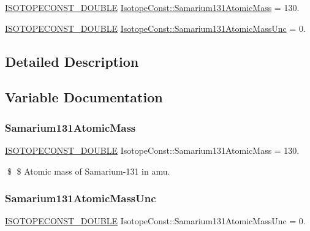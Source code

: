 \begin{DoxyCompactItemize}
\item 
\mbox{\hyperlink{group___isotope_const-_macros_ga8f45a7272ce02c0b4c65c44636ed719a}{I\+S\+O\+T\+O\+P\+E\+C\+O\+N\+S\+T\+\_\+\+D\+O\+U\+B\+LE}} \mbox{\hyperlink{group___isotope_const-_samarium-_sm131_ga10754d8bca74081ab3d7996f9eeef362}{Isotope\+Const\+::\+Samarium131\+Atomic\+Mass}} = 130.
\item 
\mbox{\hyperlink{group___isotope_const-_macros_ga8f45a7272ce02c0b4c65c44636ed719a}{I\+S\+O\+T\+O\+P\+E\+C\+O\+N\+S\+T\+\_\+\+D\+O\+U\+B\+LE}} \mbox{\hyperlink{group___isotope_const-_samarium-_sm131_ga5ceb183f8eaa890ce500002c03e512ac}{Isotope\+Const\+::\+Samarium131\+Atomic\+Mass\+Unc}} = 0.
\end{DoxyCompactItemize}


\subsection{Detailed Description}


\subsection{Variable Documentation}
\mbox{\label{group___isotope_const-_samarium-_sm131_ga10754d8bca74081ab3d7996f9eeef362}} 
\subsubsection{\texorpdfstring{Samarium131\+Atomic\+Mass}{Samarium131AtomicMass}}
{\footnotesize\ttfamily \mbox{\hyperlink{group___isotope_const-_macros_ga8f45a7272ce02c0b4c65c44636ed719a}{I\+S\+O\+T\+O\+P\+E\+C\+O\+N\+S\+T\+\_\+\+D\+O\+U\+B\+LE}} Isotope\+Const\+::\+Samarium131\+Atomic\+Mass = 130.}

\$ \$ Atomic mass of Samarium-\/131 in amu. \mbox{\label{group___isotope_const-_samarium-_sm131_ga5ceb183f8eaa890ce500002c03e512ac}} 
\subsubsection{\texorpdfstring{Samarium131\+Atomic\+Mass\+Unc}{Samarium131AtomicMassUnc}}
{\footnotesize\ttfamily \mbox{\hyperlink{group___isotope_const-_macros_ga8f45a7272ce02c0b4c65c44636ed719a}{I\+S\+O\+T\+O\+P\+E\+C\+O\+N\+S\+T\+\_\+\+D\+O\+U\+B\+LE}} Isotope\+Const\+::\+Samarium131\+Atomic\+Mass\+Unc = 0.}

